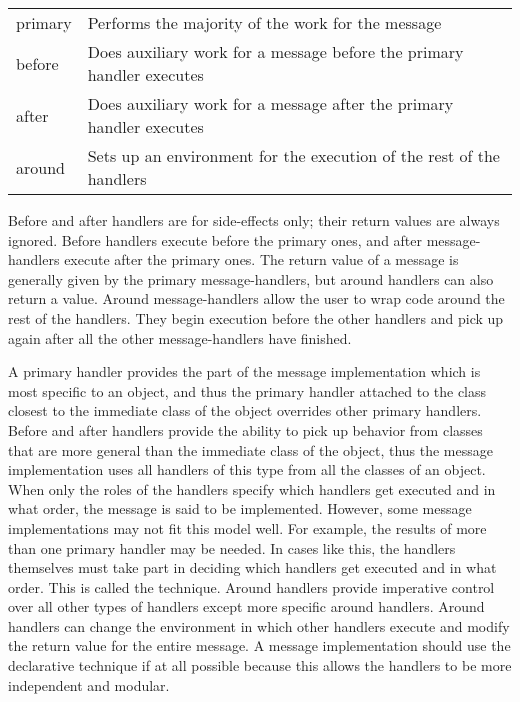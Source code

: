 \documentclass[letterpaper,10pt,english]{sphinxmanual}
\begin{document}
\begin{savenotes}\sphinxattablestart
\centering
\begin{tabulary}{\linewidth}[t]{|T|T|}
\hline
\sphinxstyletheadfamily 
{}
&\sphinxstyletheadfamily 
{}
\\
\hline
primary
&
Performs the majority of the work for the message
\\
\hline
before
&
Does auxiliary work for a message before the primary handler executes
\\
\hline
after
&
Does auxiliary work for a message after the primary handler executes
\\
\hline
around
&
Sets up an environment for the execution of the rest of the handlers
\\
\hline
\end{tabulary}
\par
\sphinxattableend\end{savenotes}

Before and after handlers are for side-effects only; their return values
are always ignored. Before handlers execute before the primary ones, and
after message-handlers execute after the primary ones. The return value
of a message is generally given by the primary message-handlers, but
around handlers can also return a value. Around message-handlers allow
the user to wrap code around the rest of the handlers. They begin
execution before the other handlers and pick up again after all the
other message-handlers have finished.

A primary handler provides the part of the message implementation which
is most specific to an object, and thus the primary handler attached to
the class closest to the immediate class of the object overrides other
primary handlers. Before and after handlers provide the ability to pick
up behavior from classes that are more general than the immediate class
of the object, thus the message implementation uses all handlers of this
type from all the classes of an object. When only the roles of the
handlers specify which handlers get executed and in what order, the
message is said to be  implemented. However, some
message implementations may not fit this model well. For example, the
results of more than one primary handler may be needed. In cases like
this, the handlers themselves must take part in deciding which handlers
get executed and in what order. This is called the 
technique. Around handlers provide imperative control over all other
types of handlers except more specific around handlers. Around handlers
can change the environment in which other handlers execute and modify
the return value for the entire message. A message implementation should
use the declarative technique if at all possible because this allows the
handlers to be more independent and modular.
\end{document}
